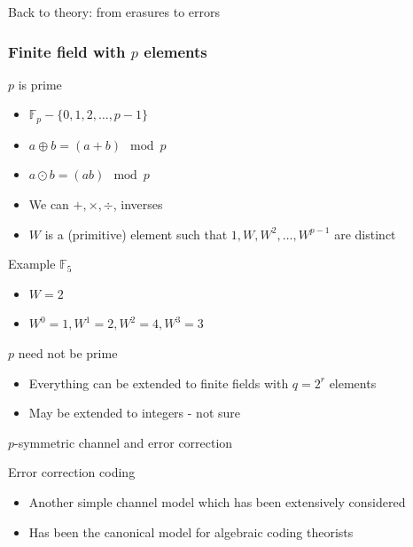 \begin{frame}{Back to theory: from erasures to errors}
\end{frame}
\begin{frame}\frametitle{Finite field with $p$ elements}
\begin{block}{$p$ is prime}
\begin{itemize}
\item $\mathbb{F}_p - \{0,1,2,\ldots,p-1\}$
\item $a \oplus b = (a+b) \mod p$
\item $a \odot b = (ab) \mod p$
\item We can $+,\times,\div$, inverses
\item $W$ is a (primitive) element such that $1,W,W^2,\ldots,W^{p-1}$ are distinct
\end{itemize}
\end{block}
\pause
\begin{block}{Example $\mathbb{F}_5$}
\begin{itemize}
\item $W=2$
\item $W^0=1, W^1=2, W^2 = 4, W^3 = 3$
\end{itemize}
\end{block}
\pause
\begin{block}{$p$ need not be prime}
\begin{itemize}
\item Everything can be extended to finite fields with $q = 2^r$ elements
\item May be extended to integers - not sure
\end{itemize}
\end{block}
\end{frame}
\begin{frame}{$p$-symmetric channel and error correction}

\begin{figure}[t]
\centering
\scalebox{0.55}{}
\end{figure}

\begin{block}{Error correction coding}
\begin{itemize}
\item Another simple channel model which has been extensively considered
\item Has been the canonical model for algebraic coding theorists
\end{itemize}
\end{block}
\end{frame}

